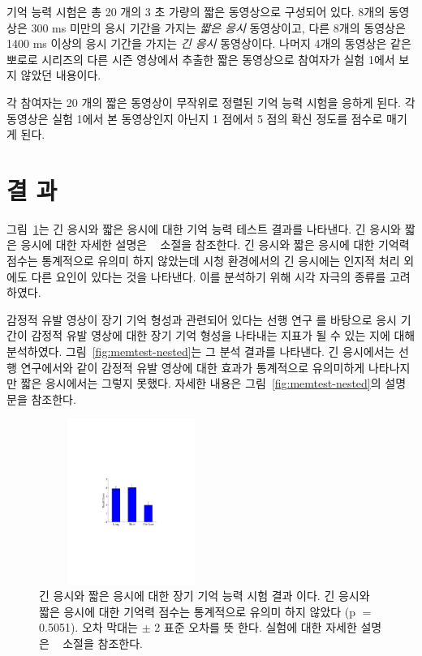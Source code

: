 \documentclass{kcc}
\begin{document}
기억 능력 시험은 총 20 개의 3 초 가량의 짧은 동영상으로 구성되어 있다. 8개의 동영상은 300 ms 미만의 응시 기간을 가지는 \textit{짧은 응시} 동영상이고, 다른 8개의 동영상은 1400 ms 이상의 응시 기간을 가지는 \textit{긴 응시} 동영상이다. 나머지 4개의 동영상은 같은 뽀로로 시리즈의 다른 시즌 영상에서 추출한 짧은 동영상으로 참여자가 실험 1에서 보지 않았던 내용이다.

각 참여자는 20 개의 짧은 동영상이 무작위로 정렬된 기억 능력 시험을 응하게 된다. 각 동영상은 실험 1에서 본 동영상인지 아닌지 1 점에서 5 점의 확신 정도를 점수로 매기게 된다. 


\section{결 과}
그림~\ref{fig:memtest-leng}는 긴 응시와 짧은 응시에 대한 기억 능력 테스트 결과를 나타낸다. 긴 응시와 짧은 응시에 대한 자세한 설명은 ~ 소절을 참조한다. 긴 응시와 짧은 응시에 대한 기억력 점수는 통계적으로 유의미 하지 않았는데 시청 환경에서의 긴 응시에는 인지적 처리 외에도 다른 요인이 있다는 것을 나타낸다. 이를 분석하기 위해 시각 자극의 종류를 고려하였다.

감정적 유발 영상이 장기 기억 형성과 관련되어 있다는 선행 연구 \cite{Cahill1996amyg,Cahill1998baso}를 바탕으로 응시 기간이 감정적 유발 영상에 대한 장기 기억 형성을 나타내는 지표가 될 수 있는 지에 대해 분석하였다. 그림~\ref{fig:memtest-nested}는 그 분석 결과를 나타낸다. 긴 응시에서는 선행 연구에서와 같이 감정적 유발 영상에 대한 효과가 통계적으로 유의미하게 나타나지만 짧은 응시에서는 그렇지 못했다. 자세한 내용은 그림~\ref{fig:memtest-nested}의 설명문을 참조한다.

\begin{figure}
  \centerline{\includegraphics[width=60mm,height=54mm,trim=65mm 103mm 68mm 100mm]{./eps/memtest_leng}}
  \caption{긴 응시와 짧은 응시에 대한 장기 기억 능력 시험 결과 이다. 긴 응시와 짧은 응시에 대한 기억력 점수는 통계적으로 유의미 하지 않았다 (p $=$ 0.5051). 오차 막대는 $\pm$ 2 표준 오차를 뜻 한다. 실험에 대한 자세한 설명은 ~ 소절을 참조한다.}
  \label{fig:memtest-leng}
\end{figure}
\end{document}
